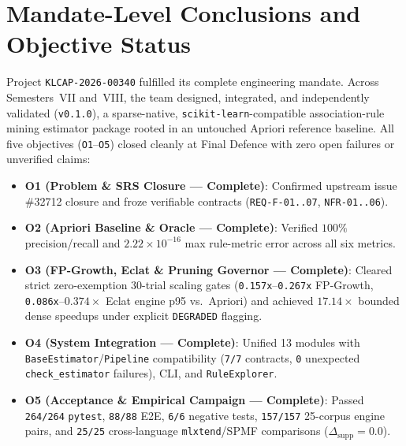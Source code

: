 \section{Mandate-Level Conclusions and Objective Status}
Project \texttt{KLCAP-2026-00340} fulfilled its complete engineering mandate. Across Semesters~VII and~VIII, the team designed, integrated, and independently validated \skarm (\texttt{v0.1.0}), a sparse-native, \texttt{scikit-learn}-compatible association-rule mining estimator package rooted in an untouched Apriori reference baseline. All five objectives (\texttt{O1}--\texttt{O5}) closed cleanly at Final Defence with zero open failures or unverified claims:
\begin{itemize}
  \item \textbf{O1 (Problem \& SRS Closure --- Complete)}: Confirmed upstream issue \#32712 closure and froze verifiable contracts (\texttt{REQ-F-01..07}, \texttt{NFR-01..06}).
  \item \textbf{O2 (Apriori Baseline \& Oracle --- Complete)}: Verified $100\%$ precision/recall and $2.22 \times 10^{-16}$ max rule-metric error across all six metrics.
  \item \textbf{O3 (FP-Growth, Eclat \& Pruning Governor --- Complete)}: Cleared strict zero-exemption 30-trial scaling gates (\texttt{0.157x}--\texttt{0.267x} FP-Growth, \texttt{0.086x}--$0.374\times$ Eclat engine p95 vs.\ Apriori) and achieved $17.14\times$ bounded dense speedups under explicit \texttt{DEGRADED} flagging.
  \item \textbf{O4 (System Integration --- Complete)}: Unified 13 modules with \texttt{BaseEstimator}/\texttt{Pipeline} compatibility (\texttt{7/\protect\allowbreak{}7} contracts, \texttt{0} unexpected \texttt{check\_\protect\allowbreak{}estimator} failures), CLI, and \texttt{RuleExplorer}.
  \item \textbf{O5 (Acceptance \& Empirical Campaign --- Complete)}: Passed \texttt{264/\protect\allowbreak{}264} \texttt{pytest}, \texttt{88/\protect\allowbreak{}88} E2E, \texttt{6/\protect\allowbreak{}6} negative tests, \texttt{157/\protect\allowbreak{}157} 25-corpus engine pairs, and \texttt{25/\protect\allowbreak{}25} cross-language \texttt{mlxtend}/SPMF comparisons ($\Delta_{\mathrm{supp}}=0.0$).
\end{itemize}

